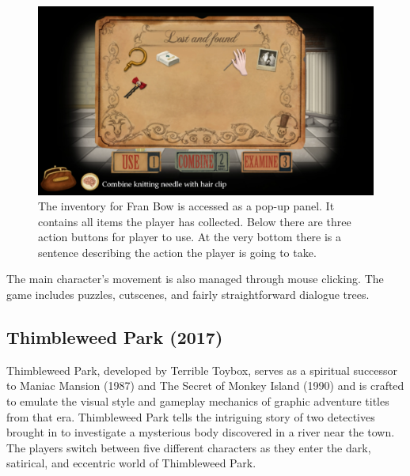 \begin{figure}[H]
\centering
\includegraphics[width=1.\linewidth]{img/Fran_Bow.png}
\caption{The inventory for Fran Bow is accessed as a pop-up panel. It contains all items the player has collected. Below there are three action buttons for player to use. At the very bottom there is a sentence describing the action the player is going to take.}
\label{fig:FranBow}
\end{figure}

The main character's movement is also managed through mouse clicking. The game includes puzzles, cutscenes, and fairly straightforward dialogue trees.




\subsection{Thimbleweed Park (2017)}
Thimbleweed Park, developed by Terrible Toybox, serves as a spiritual successor to Maniac Mansion (1987) and The Secret of Monkey Island (1990) and is crafted to emulate the visual style and gameplay mechanics of graphic adventure titles from that era. Thimbleweed Park tells the intriguing story of two detectives brought in to investigate a mysterious body discovered in a river near the town. The players switch between five different characters as they enter the dark, satirical, and eccentric world of Thimbleweed Park\cite{Matulef2014}.


